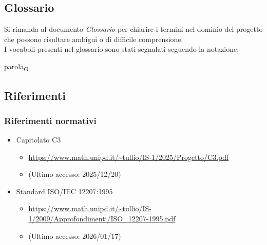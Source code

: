 \documentclass[a4paper,12pt]{article}
\begin{document}
    \subsection{Glossario}
        Si rimanda al documento \textit{Glossario} per chiarire i termini nel dominio del progetto che possono risultare ambigui o di difficile comprensione.\\
        I vocaboli presenti nel glossario sono stati segnalati seguendo la notazione:
        \begin{center}
            parola\textsubscript{G}
        \end{center}

    \subsection{Riferimenti}
        \subsubsection{Riferimenti normativi}
            \begin{itemize}
                \item Capitolato C3
                \begin{itemize}
                    \item {\url{https://www.math.unipd.it/~tullio/IS-1/2025/Progetto/C3.pdf}}
                    \item[] (Ultimo accesso: 2025/12/20)
                \end{itemize}
                \item Standard ISO/IEC 12207:1995
                \begin{itemize}
                    \item \url{https://www.math.unipd.it/~tullio/IS-1/2009/Approfondimenti/ISO_12207-1995.pdf}
                    \item[] (Ultimo accesso: 2026/01/17)
                \end{itemize}
            \end{itemize}
\end{document}
